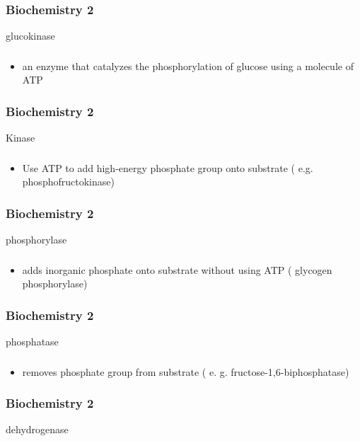 \documentclass[11pt]{beamer}
\begin{document}
\begin{frame}
 \frametitle{Biochemistry 2}
glucokinase 
\end{frame}

\begin{frame}
 \frametitle{}
\begin{itemize}
\item an enzyme that catalyzes the phosphorylation of glucose using a molecule of ATP
\end{itemize}
\end{frame}

\begin{frame}
 \frametitle{Biochemistry 2}
Kinase 
\end{frame}

\begin{frame}
 \frametitle{}
\begin{itemize}
\item Use ATP to add high-energy phosphate group onto substrate ( e.g. phosphofructokinase) 
\end{itemize}
\end{frame}

\begin{frame}
 \frametitle{Biochemistry 2}
phosphorylase 
\end{frame}

\begin{frame}
 \frametitle{}
\begin{itemize}
\item adds inorganic phosphate onto substrate without using ATP ( glycogen phosphorylase) 
\end{itemize}
\end{frame}

\begin{frame}
 \frametitle{Biochemistry 2}
phosphatase 
\end{frame}

\begin{frame}
 \frametitle{}
\begin{itemize}
\item removes phosphate group from substrate ( e. g. fructose-1,6-biphosphatase) 
\end{itemize}
\end{frame}

\begin{frame}
 \frametitle{Biochemistry 2}
dehydrogenase 
\end{frame}
\end{document}
